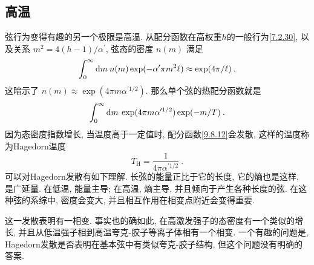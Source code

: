 \subsection*{高温}

弦行为变得有趣的另一个极限是高温. 从配分函数在高权重$h$的一般行为\eqref{7.2.30}, 以及关系 $m^{2}=4(h-1) / \alpha^{\prime}$, 
弦态的密度 $n(m)$ 满足
\begin{equation}
	\int_{0}^{\infty} \mathrm{d} m\: n(m) \exp (-\alpha^{\prime} \pi m^{2} \ell) \approx \exp (4 \pi / \ell) \:, \label{9.8.11}
\end{equation}
这暗示了 $n(m) \approx \exp (4 \pi m \alpha^{\prime 1/2})$. 那么单个弦的热配分函数就是
\begin{equation}
	\int_{0}^{\infty} \mathrm{d} m \: \exp (4 \pi m \alpha^{\prime 1/2}) \exp (-m / T) \:. \label{9.8.12}
\end{equation}
因为态密度指数增长, 当温度高于一定值时, 配分函数\eqref{9.8.12}会发散, 这样的温度称为Hagedorn温度
\begin{equation}
	T_{\mathrm{H}}=\frac{1}{4 \pi \alpha^{\prime 1/2}} \:. \label{9.8.13}
\end{equation}
可以对Hagedorn发散有如下理解. 长弦的能量正比于它的长度, 它的熵也是这样, 是广延量. 在低温, 能量主导; 在高温, 熵主导, 并且倾向于产生各种长度的弦. 
在这种弦的系综中, 密度会变大, 并且相互作用在相变点附近会变得重要. 

这一发散表明有一相变. 事实也的确如此, 在高激发强子的态密度有一个类似的增长, 并且从低温强子相到高温夸克-胶子等离子体相有一个相变. 
一个有趣的问题是, Hagedorn发散是否表明在基本弦中有类似夸克-胶子结构, 但这个问题没有明确的答案. 

